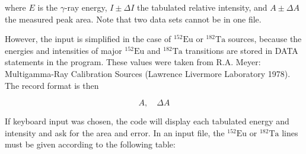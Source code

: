 \documentclass[10pt]{article}
\begin{document}
where $E$ is the $\gamma$-ray energy, $I \pm \Delta I$ the tabulated relative intensity, and $A \pm \Delta A$ the measured peak area. Note that two data sets cannot be in one file.

However, the input is simplified in the case of ${ }^{152} \mathrm{Eu}$ or ${ }^{182} \mathrm{Ta}$ sources, because the energies and intensities of major ${ }^{152} \mathrm{Eu}$ and ${ }^{182} \mathrm{Ta}$ transitions are stored in DATA statements in the program. These values were taken from R.A. Meyer: Multigamma-Ray Calibration Sources (Lawrence Livermore Laboratory 1978). The record format is then

$$
A, \quad \Delta A
$$

If keyboard input was chosen, the code will display each tabulated energy and intensity and ask for the area and error. In an input file, the ${ }^{152} \mathrm{Eu}$ or ${ }^{182} \mathrm{Ta}$ lines must be given according to the following table:
\end{document}
